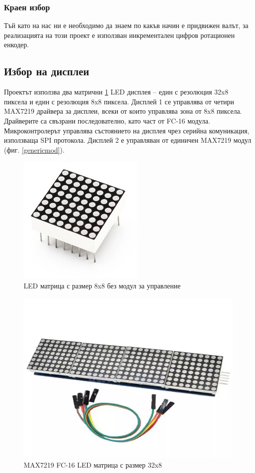 \documentclass[titlepage, oneside, 14pt]{extbook}
\begin{document}
\subsubsection*{Краен избор}

Тъй като на нас ни е необходимо да знаем по какъв начин е придвижен валът, за
реализацията на този проект е използван инкрементален цифров ротационен
енкодер.

\subsection{Избор на дисплеи}

Проектът използва два матрични \ref{matrix} LED дисплея -- един с резолюция 32x8 пиксела и един с резолюция 8x8 пиксела.
Дисплей 1 се управлява от четири MAX7219 \cite{displaytut} драйвера за дисплеи, всеки от които управлява зона
от 8x8 пиксела. Драйверите са свъзрани последователно, като част от FC-16
модула. Микроконтролерът управлява състоянието на дисплея чрез серийна комуникация,
използваща SPI протокола. Дисплей 2 е управляван от единичен MAX7219 модул (фиг. \ref{genericmod}).

\begin{figure}[!htbp]
    \centering
    \includegraphics[width=0.5\linewidth]{img/display_matrix.jpg}
    \caption{LED матрица с размер 8x8 без модул за управление}
    \label{matrix}
\end{figure}

\begin{figure}[!htbp]
    \centering
    \includegraphics[width=0.5\linewidth]{img/display.png}
    \caption{MAX7219 FC-16 LED матрица с размер 32x8}
\end{figure}
\end{document}
